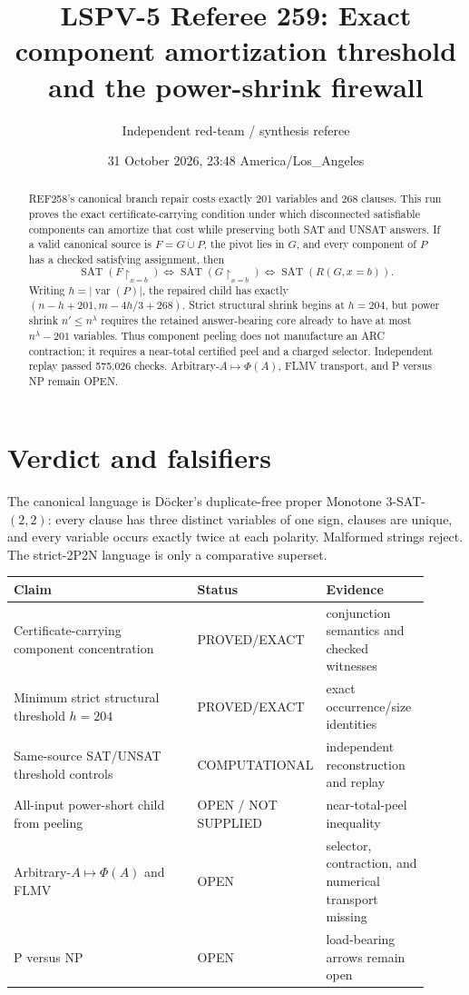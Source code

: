 \documentclass[11pt]{article}
\title{LSPV-5 Referee 259: Exact component amortization threshold and the power-shrink firewall}
\author{Independent red-team / synthesis referee}
\date{31 October 2026, 23:48 America/Los\_Angeles}
\newcommand{\status}[1]{\textsf{#1}}
\begin{document}
\maketitle

\begin{abstract}
REF258's canonical branch repair costs exactly 201 variables and 268 clauses.  This run proves the exact certificate-carrying condition under which disconnected satisfiable components can amortize that cost while preserving both SAT and UNSAT answers.  If a valid canonical source is $F=G\mathbin{\dot\cup}P$, the pivot lies in $G$, and every component of $P$ has a checked satisfying assignment, then
\[
 \operatorname{SAT}(F\!\upharpoonright_{x=b})
 \iff \operatorname{SAT}(G\!\upharpoonright_{x=b})
 \iff \operatorname{SAT}(R(G,x=b)).
\]
Writing $h=|\operatorname{var}(P)|$, the repaired child has exactly
$(n-h+201,m-4h/3+268)$.  Strict structural shrink begins at $h=204$, but power shrink $n'\le n^\lambda$ requires the retained answer-bearing core already to have at most $n^\lambda-201$ variables.  Thus component peeling does not manufacture an ARC contraction; it requires a near-total certified peel and a charged selector.  Independent replay passed 575,026 checks.  Arbitrary-$A\mapsto\Phi(A)$, FLMV transport, and P versus NP remain \status{OPEN}.
\end{abstract}

\section{Verdict and falsifiers}
The canonical language is D\"ocker's duplicate-free proper Monotone 3-SAT-$(2,2)$: every clause has three distinct variables of one sign, clauses are unique, and every variable occurs exactly twice at each polarity.  Malformed strings reject.  The strict-2P2N language is only a comparative superset.

\begin{center}
\begin{tabular}{p{0.46\linewidth}p{0.20\linewidth}p{0.25\linewidth}}
\toprule
Claim & Status & Evidence\\
\midrule
Certificate-carrying component concentration & \status{PROVED/EXACT} & conjunction semantics and checked witnesses\\
Minimum strict structural threshold $h=204$ & \status{PROVED/EXACT} & exact occurrence/size identities\\
Same-source SAT/UNSAT threshold controls & \status{COMPUTATIONAL} & independent reconstruction and replay\\
All-input power-short child from peeling & \status{OPEN / NOT SUPPLIED} & near-total-peel inequality\\
Arbitrary-$A\mapsto\Phi(A)$ and FLMV & \status{OPEN} & selector, contraction, and numerical transport missing\\
P versus NP & \status{OPEN} & load-bearing arrows remain open\\
\bottomrule
\end{tabular}
\end{center}
\end{document}
